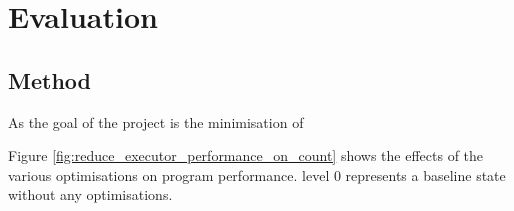 \chapter{Evaluation} \label{C:evaluation}

\section{Method}
As the goal of the project is the minimisation of 




Figure \ref{fig:reduce_executor_performance_on_count} shows the effects of the various optimisations on program performance. level 0 represents a baseline state without any optimisations.


